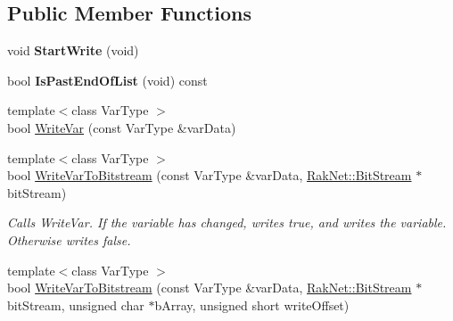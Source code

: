 \subsection*{Public Member Functions}
\begin{DoxyCompactItemize}
\item 
\hypertarget{class_rak_net_1_1_variable_list_delta_tracker_a85fb2ff6ff30540b2d4d313eeeedf350}{void {\bfseries Start\-Write} (void)}\label{class_rak_net_1_1_variable_list_delta_tracker_a85fb2ff6ff30540b2d4d313eeeedf350}

\item 
\hypertarget{class_rak_net_1_1_variable_list_delta_tracker_ae3e89e4348a21233b8bc7fbcc73109b0}{bool {\bfseries Is\-Past\-End\-Of\-List} (void) const }\label{class_rak_net_1_1_variable_list_delta_tracker_ae3e89e4348a21233b8bc7fbcc73109b0}

\item 
{\footnotesize template$<$class Var\-Type $>$ }\\bool \hyperlink{class_rak_net_1_1_variable_list_delta_tracker_a1b290d704a8c53be32a7613f86f113f4}{Write\-Var} (const Var\-Type \&var\-Data)
\item 
\hypertarget{class_rak_net_1_1_variable_list_delta_tracker_a349cf26aa8c11dd567babb507241dd72}{{\footnotesize template$<$class Var\-Type $>$ }\\bool \hyperlink{class_rak_net_1_1_variable_list_delta_tracker_a349cf26aa8c11dd567babb507241dd72}{Write\-Var\-To\-Bitstream} (const Var\-Type \&var\-Data, \hyperlink{class_rak_net_1_1_bit_stream}{Rak\-Net\-::\-Bit\-Stream} $\ast$bit\-Stream)}\label{class_rak_net_1_1_variable_list_delta_tracker_a349cf26aa8c11dd567babb507241dd72}

\begin{DoxyCompactList}\small\item\em Calls Write\-Var. If the variable has changed, writes true, and writes the variable. Otherwise writes false. \end{DoxyCompactList}\item 
\hypertarget{class_rak_net_1_1_variable_list_delta_tracker_aeb21d3c2beb53cceeee6b5072c855043}{{\footnotesize template$<$class Var\-Type $>$ }\\bool \hyperlink{class_rak_net_1_1_variable_list_delta_tracker_aeb21d3c2beb53cceeee6b5072c855043}{Write\-Var\-To\-Bitstream} (const Var\-Type \&var\-Data, \hyperlink{class_rak_net_1_1_bit_stream}{Rak\-Net\-::\-Bit\-Stream} $\ast$bit\-Stream, unsigned char $\ast$b\-Array, unsigned short write\-Offset)}\label{class_rak_net_1_1_variable_list_delta_tracker_aeb21d3c2beb53cceeee6b5072c855043}


\end{DoxyCompactItemize}
